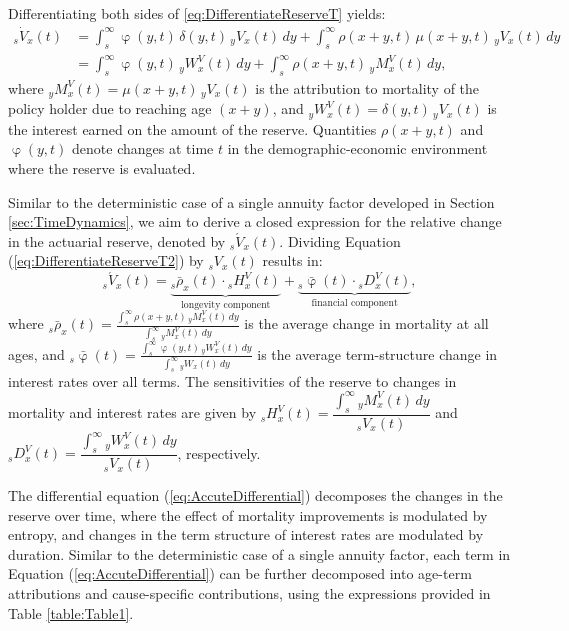 \documentclass[12pt]{article}
\begin{document}
{Differentiating both sides of \ref{eq:DifferentiateReserveT} yields:
\begin{equation}\label{eq:DifferentiateReserveT2}
	\begin{split}
		{}_s\dot{V}_x(t) &= \int_s^\infty \upvarphi(y,t) \, \delta(y,t) \, {}_yV_x(t) \, dy + \int_s^\infty \rho(x+y,t) \, \mu(x+y,t) \, {}_yV_x(t) \, dy \\ 
		&= \int_s^\infty \upvarphi(y,t) \, {}_yW^V_x(t) \, dy + \int_s^\infty \rho(x+y,t) \, {}_yM^V_x(t) \, dy,
	\end{split}
\end{equation}
where ${}_yM^V_x(t) = \mu(x+y,t) \, {}_yV_x(t)$ is the attribution to mortality of the policy holder due to reaching age $(x+y)$, and ${}_yW^V_x(t) = \delta(y,t) \, {}_yV_x(t)$ is the interest earned on the amount of the reserve. Quantities $\rho(x+y,t)$ and $\upvarphi(y,t)$ denote changes at time $t$ in the demographic-economic environment where the reserve is evaluated. 


Similar to the deterministic case of a single annuity factor developed in Section \ref{sec:TimeDynamics}, we aim to derive a closed expression for the relative change in the actuarial reserve, denoted by ${}_s\acute{V}_x(t)$. Dividing Equation (\ref{eq:DifferentiateReserveT2}) by ${}_sV_x(t)$ results in:
\begin{equation}\label{eq:AccuteDifferential}
	{}_s\acute{V}_x(t) = \underbrace{{}_s\bar{\rho}_x(t) \cdot {}_sH_x^V(t)}_\text{longevity component} + \underbrace{{}_s\bar{\upvarphi}(t) \cdot {}_sD_x^V(t)}_\text{financial component},
\end{equation}
where ${}_s\bar{\rho}_x(t) = \frac{\int_s^\infty \rho(x+y,t) \, {}_yM^V_x(t) \, dy}{\int_s^\infty {}_yM^V_x(t) \, dy}$ is the average change in mortality at all ages, and ${}_s\bar{\upvarphi}(t) = \frac{\int_s^\infty \upvarphi(y,t) \, {}_yW^V_x(t) \, dy}{\int_s^\infty {}_yW_x(t) \, dy}$ is the average term-structure change in interest rates over all terms. The sensitivities of the reserve to changes in mortality and interest rates are given by ${}_sH_x^V(t) = \dfrac{\int_{s}^{\infty} {}_yM^V_x(t) \, dy}{{}_sV_x(t)}$ and ${}_sD_x^V(t) = \dfrac{\int_{s}^{\infty} {}_yW^V_x(t) \, dy}{{}_sV_x(t)}$, respectively.

The differential equation (\ref{eq:AccuteDifferential}) decomposes the changes in the reserve over time, where the effect of mortality improvements is modulated by entropy, and changes in the term structure of interest rates are modulated by duration. Similar to the deterministic case of a single annuity factor, each term in Equation (\ref{eq:AccuteDifferential}) can be further decomposed into age-term attributions and cause-specific contributions, using the expressions provided in Table \ref{table:Table1}.



}
\end{document}
